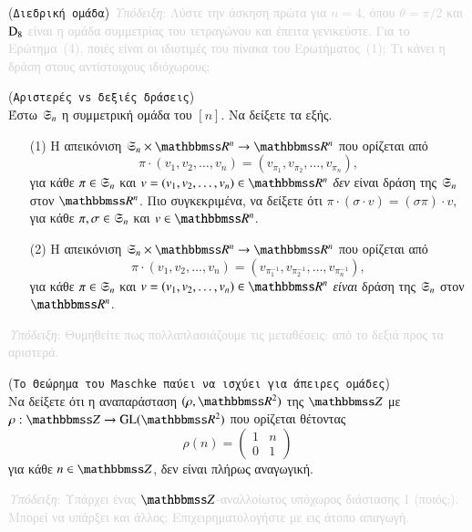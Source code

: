 \documentclass[12pt,a4paper,reqno]{amsart}
\begin{document}
\begin{exercise}{(\texttt{Διεδρική ομάδα})}
\textcolor{lightgray}{\small{\emph{Υπόδειξη}: Λύστε την άσκηση πρώτα για $n=4$, όπου $\theta = \pi/2$ και $\mathrm{D}_8$ είναι η ομάδα συμμετρίας του τετραγώνου και έπειτα γενικεύστε. Για το Ερώτημα~(4), ποιές είναι οι ιδιοτιμές του πίνακα του Ερωτήματος~(1); Τι κάνει η δράση στους αντίστοιχους ιδιόχωρους;}}
\end{exercise}

\begin{exercise}{(\texttt{Αριστερές vs δεξιές δράσεις})}
    \\
    Έστω $\mathfrak{S}_n$ η συμμετρική ομάδα του $[n]$. Να δείξετε τα εξής. 
    \begin{itemize}
        \item[(1)] Η απεικόνιση $\fS_n\times\RR^n \to \RR^n$ που ορίζεται από 
        \[
        \pi\cdot(v_1, v_2, \dots, v_n) = (v_{\pi_1},v_{\pi_2}, \dots, v_{\pi_n}),
        \]
        για κάθε $\pi \in \mathfrak{S}_n$ και $v = (v_1, v_2, \dots, v_n) \in \RR^n$ \emph{δεν} είναι δράση της $\mathfrak{S}_n$ στον $\RR^n$. Πιο συγκεκριμένα, να δείξετε ότι 
        $\pi\cdot(\sigma\cdot v) = (\sigma\pi)\cdot v,$
        για κάθε $\pi, \sigma \in \mathfrak{S}_n$ και $v \in \RR^n$.
        \item[(2)] Η απεικόνιση $\fS_n\times\RR^n \to \RR^n$ που ορίζεται από 
        \[
        \pi\cdot(v_1, v_2, \dots, v_n) = (v_{\pi_1^{-1}},v_{\pi_2^{-1}}, \dots, v_{\pi_n^{-1}}),
        \]
        για κάθε $\pi \in \mathfrak{S}_n$ και $v = (v_1, v_2, \dots, v_n) \in \RR^n$ \emph{είναι} δράση της $\mathfrak{S}_n$ στον $\RR^n$.
    \end{itemize}

    \textcolor{lightgray}{\small{\emph{Υπόδειξη}: Θυμηθείτε πως πολλαπλασιάζουμε τις μεταθέσεις: από το δεξιά προς τα αριστερά.}}
\end{exercise}

\begin{exercise}{(\texttt{Το Θεώρημα του Maschke παύει να ισχύει για άπειρες ομάδες})}
    \\
    Να δείξετε ότι η αναπαράσταση $(\rho, \RR^2)$ της $\ZZ$ με $\rho : \ZZ \to \GL(\RR^2)$ που ορίζεται θέτοντας
    \[
    \rho(n) = 
        \begin{pmatrix}
            1 & n \\
            0 & 1
        \end{pmatrix}
    \]
    για κάθε $n \in \ZZ$, δεν είναι πλήρως αναγωγική.

    \textcolor{lightgray}{\small{\emph{Υπόδειξη}: Υπάρχει ένας $\ZZ$-αναλλοίωτος υπόχωρος διάστασης 1 (ποιός;). Μπορεί να υπάρξει και άλλος; Επιχειρηματολογήστε με εις άτοπο απαγωγή.}}
\end{exercise}
\end{document}

